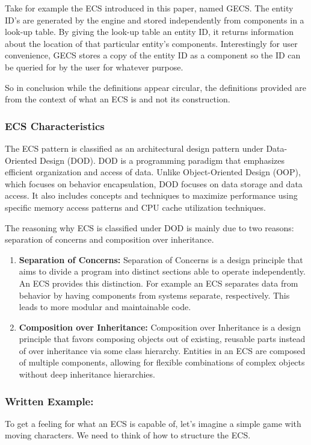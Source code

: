 Take for example the ECS introduced in this paper, named GECS. The entity ID's are generated by the engine and stored independently from components in a look-up table. By giving the look-up table an entity ID, it returns information about the location of that particular entity's components. Interestingly for user convenience, GECS stores a copy of the entity ID as a component so the ID can be queried for by the user for whatever purpose.

So in conclusion while the definitions appear circular, the definitions provided are from the context of what an ECS is and not its construction.

\subsubsection{ECS Characteristics}
The ECS pattern is classified as an architectural design pattern under Data-Oriented Design (DOD)\cite{RomeoPHD}. DOD is a programming paradigm that emphasizes efficient organization and access of data. Unlike Object-Oriented Design (OOP), which focuses on behavior encapsulation, DOD focuses on data storage and data access. It also includes concepts and techniques to maximize performance using specific memory access patterns and CPU cache utilization techniques.

The reasoning why ECS is classified under DOD is mainly due to two reasons: separation of concerns and composition over inheritance.

\begin{enumerate}
    \item \textbf{Separation of Concerns:} Separation of Concerns is a design principle that aims to divide a program into distinct sections able to operate independently. An ECS provides this distinction. For example an ECS separates data from behavior by having components from systems separate, respectively. This leads to more modular and maintainable code.
    \item \textbf{Composition over Inheritance: }Composition over Inheritance is a design principle that favors composing objects out of existing, reusable parts instead of over inheritance via some class hierarchy. Entities in an ECS are composed of multiple components, allowing for flexible combinations of complex objects without deep inheritance hierarchies. 
\end{enumerate}

\subsubsection{Written Example:}
To get a feeling for what an ECS is capable of, let's imagine a simple game with moving characters. We need to think of how to structure the ECS. 

